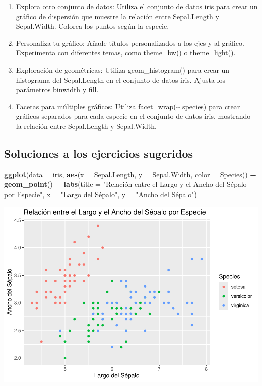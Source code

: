 \documentclass[
]{book}
\newenvironment{Shaded}{\begin{snugshade}}{\end{snugshade}}
\newcommand{\AttributeTok}[1]{\textcolor[rgb]{0.13,0.29,0.53}{#1}}
\newcommand{\FunctionTok}[1]{\textcolor[rgb]{0.13,0.29,0.53}{\textbf{#1}}}
\newcommand{\NormalTok}[1]{#1}
\newcommand{\SpecialCharTok}[1]{\textcolor[rgb]{0.81,0.36,0.00}{\textbf{#1}}}
\newcommand{\StringTok}[1]{\textcolor[rgb]{0.31,0.60,0.02}{#1}}
\providecommand{\tightlist}{%
  \setlength{\itemsep}{0pt}\setlength{\parskip}{0pt}}
\begin{document}
\begin{enumerate}
\def\labelenumi{\arabic{enumi}.}
\tightlist
\item
  Explora otro conjunto de datos: Utiliza el conjunto de datos iris para crear un gráfico de dispersión que muestre la relación entre Sepal.Length y Sepal.Width. Colorea los puntos según la especie.
\item
  Personaliza tu gráfico: Añade títulos personalizados a los ejes y al gráfico. Experimenta con diferentes temas, como theme\_bw() o theme\_light().
\item
  Exploración de geométricas: Utiliza geom\_histogram() para crear un histograma del Sepal.Length en el conjunto de datos iris. Ajusta los parámetros binwidth y fill.
\item
  Facetas para múltiples gráficos: Utiliza facet\_wrap(\textasciitilde{} species) para crear gráficos separados para cada especie en el conjunto de datos iris, mostrando la relación entre Sepal.Length y Sepal.Width.
\end{enumerate}

\subsection{Soluciones a los ejercicios sugeridos}\label{soluciones-a-los-ejercicios-sugeridos}

\begin{Shaded}
\begin{Highlighting}[]
\FunctionTok{ggplot}\NormalTok{(}\AttributeTok{data =}\NormalTok{ iris, }\FunctionTok{aes}\NormalTok{(}\AttributeTok{x =}\NormalTok{ Sepal.Length, }\AttributeTok{y =}\NormalTok{ Sepal.Width, }\AttributeTok{color =}\NormalTok{ Species)) }\SpecialCharTok{+} 
  \FunctionTok{geom\_point}\NormalTok{() }\SpecialCharTok{+}
  \FunctionTok{labs}\NormalTok{(}\AttributeTok{title =} \StringTok{"Relación entre el Largo y el Ancho del Sépalo por Especie"}\NormalTok{,}
       \AttributeTok{x =} \StringTok{"Largo del Sépalo"}\NormalTok{,}
       \AttributeTok{y =} \StringTok{"Ancho del Sépalo"}\NormalTok{)}
\end{Highlighting}
\end{Shaded}

\includegraphics{bookdown-demo_files/figure-latex/unnamed-chunk-176-1.pdf}
\end{document}
